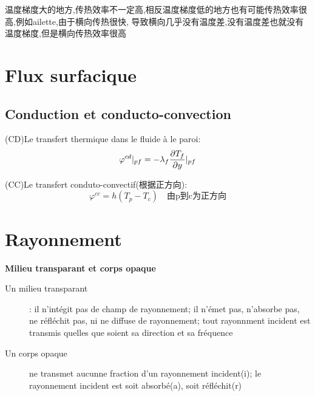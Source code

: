 \documentclass{article}
\begin{document}
温度梯度大的地方,传热效率不一定高,相反温度梯度低的地方也有可能传热效率很高,例如ailette,由于横向传热很快,
导致横向几乎没有温度差,没有温度差也就没有温度梯度,但是横向传热效率很高

\section{Flux surfacique}
\subsection{Conduction et conducto-convection}
(CD)Le transfert thermique dans le fluide \`a le paroi:
$$\varphi^{cd} |_{pf} = -\\\lambda _f \frac{\partial T_f}{\partial y}|_{pf}$$

(CC)Le transfert conduto-convectif(根据正方向):
$$\varphi ^{cc}=h(T_p - T_c) \quad \text{由p到c为正方向}$$

\section{Rayonnement}
\textbf{Milieu transparant et corps opaque}
\begin{description}
\item[Un milieu transparant]: il n'int\'egit pas de champ de rayonnement; il n'\'emet pas, n'absorbe pas, ne r\'efl\'echit pas, ni ne diffuse de rayonnement; tout rayonnment incident est transmis quelles que soient sa direction et sa fr\'equence
\item[Un corps opaque] ne transmet aucunne fraction d'un rayonnement incident(i); le rayonnement incident est soit absorb\'e(a), soit r\'efl\'echit(r)
\end{description}
\end{document}
